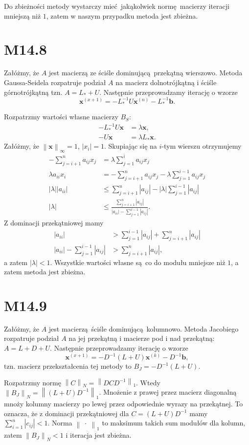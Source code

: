 \documentclass[a4paper, 12pt]{article}
\newcommand{\norm}[1]{\left\lVert #1 \right\rVert}
\newcommand{\modulus}[1]{\left| #1 \right|}
\newcommand{\abs}{\modulus}
\newcommand{\+}{\enspace}
\begin{document}
Do zbieżności metody wystarczy mieć jakąkolwiek normę macierzy iteracji
mniejszą niż $1$, zatem w naszym przypadku metoda jest zbieżna.

\section*{M14.8}
Załóżmy, że $A$ jest macierzą ze ściśle dominującą przekątną wierszowo.
Metoda Gaussa-Seidela rozpatruje podział $A$ na macierz dolnotrójkątną i ściśle
górnotrójkątną tzn.  $A = L_* + U$.
Następnie przeprowadzamy iterację o wzorze
$$ \mathbf{x}^{(x+1)} = -L_*^{-1}U\mathbf{x}^{(n)} - L_*^{-1} \mathbf{b}.$$

Rozpatrzmy wartości własne macierzy $B_S$:
\begin{align*}
	-L_*^{-1}U \mathbf{x} &= λ \mathbf{x}, \\
	-U \mathbf{x} &= λ L_* \mathbf{x}.
\end{align*}
Załóżmy, że $\norm{\mathbf{x}}_∞ = 1$, $\abs{x_i} = 1$.
Skupiając się na $i$-tym wierszu otrzymujemy
\begin{align*}
	-∑_{j=i+1}^n a_{ij} x_j &= λ∑_{j=1}^i a_{ij}x_j \\
	λ a_{ii} x_i &= -∑_{j=i+1}^n a_{ij} x_j - λ∑_{j=1}^{i-1} a_{ij} x_j \\
	\abs{λ} \abs{a_{ii}} &≤ ∑_{j=i+1}^n \abs{a_{ij}} - \abs{λ}∑_{j=1}^{i-1} \abs{a_{ij}} \\
	\abs{λ} &≤
		\frac{∑_{j=i+1}^n \abs{a_{ij}}}
		     {\abs{a_{ii}} - ∑_{j=1}^{i-1} \abs{a_{ij}}}.
\end{align*}
Z dominacji przekątniowej mamy
\begin{align*}
	\abs{a_{ii}} &> ∑_{j=1}^{i-1} \abs{a_{ij}} + ∑_{j=i+1}^n \abs{a_{ij}} \\
	\abs{a_{ii}} -∑_{j=1}^{i-1} \abs{a_{ij}} &> ∑_{j=i+1}^n \abs{a_{ij}},
\end{align*}
a zatem $\abs{λ} < 1$.
Wszystkie wartości własne są co do modułu mniejsze niż $1$,
a zatem metoda jest zbieżna.

\section*{M14.9}
Załóżmy, że $A$ jest macierzą ściśle dominującą kolumnowo.
Metoda Jacobiego rozpatruje podział $A$ na jej przekątną i macierze pod
i nad przekątną:
$A = L + D + U$.
Następnie przeprowadzamy iterację o wzorze
$$ \mathbf{x}^{(x+1)} = - D^{-1}(L + U)\mathbf{x}^{(k)} - D^{-1} \mathbf{b}, $$
tzn. macierz przekształcenia tej metody to $B_J = -D^{-1}(L+U)$.

Rozpatrzmy normę $\norm{C}_N = \norm{D C D^{-1}}_1$.
Wtedy $\norm{B_J}_N = \norm{(L+U)D^{-1}}_1$.
Mnożenie z prawej przez macierz diagonalną mnoży kolumny macierzy po lewej przez
odpowiednie wyrazy na przekątnej.
To oznacza, że z dominacji przekątniowej dla $C = (L+U)D^{-1}$ mamy
$∑_{i=1}^n \abs{c_{ij}} < 1$.
Norma $\norm{\;·\;}_1$ to maksimum takich sum modułów dla kolumn, zatem
$\norm{B_J}_N < 1$ i iteracja jest zbieżna.
\end{document}
